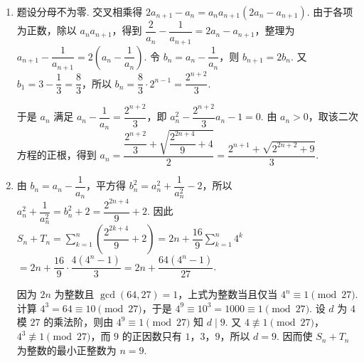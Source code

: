 \begin{solution}
\begin{enumerate}
\item 题设分母不为零. 交叉相乘得
\(2a_{n+1}-a_n=a_na_{n+1}(2a_n-a_{n+1})\).
由于各项为正数，除以 \(a_na_{n+1}\)，得到
\(\dfrac2{a_n}-\dfrac1{a_{n+1}}=2a_n-a_{n+1}\)，整理为
\(a_{n+1}-\dfrac1{a_{n+1}}=2\left(a_n-\dfrac1{a_n}\right)\).
令 \(b_n=a_n-\dfrac1{a_n}\)，则 \(b_{n+1}=2b_n\). 又
\(b_1=3-\dfrac13=\dfrac83\)，所以
\(b_n=\dfrac83\cdot2^{n-1}=\dfrac{2^{n+2}}3\).

于是 \(a_n\) 满足 \(a_n-\dfrac1{a_n}=\dfrac{2^{n+2}}3\)，即
\(a_n^2-\dfrac{2^{n+2}}3a_n-1=0\). 由 \(a_n>0\)，取该二次方程的正根，得到
\(a_n=\dfrac{\dfrac{2^{n+2}}3+\sqrt{\dfrac{2^{2n+4}}9+4}}2
=\dfrac{2^{n+1}+\sqrt{2^{2n+2}+9}}3\).
\item 由 \(b_n=a_n-\dfrac1{a_n}\)，平方得
\(b_n^2=a_n^2+\dfrac1{a_n^2}-2\)，所以
\(a_n^2+\dfrac1{a_n^2}=b_n^2+2=\dfrac{2^{2n+4}}9+2\).
因此
\(S_n+T_n=\sum_{k=1}^n\left(\dfrac{2^{2k+4}}9+2\right)
=2n+\dfrac{16}{9}\sum_{k=1}^n4^k\)
\(=2n+\dfrac{16}{9}\cdot\dfrac{4(4^n-1)}3
=2n+\dfrac{64(4^n-1)}{27}\).

因为 \(2n\) 为整数且 \(\gcd(64,27)=1\)，上式为整数当且仅当
\(4^n\equiv1\pmod{27}\). 计算 \(4^3=64\equiv10\pmod{27}\)，于是
\(4^9\equiv10^3=1000\equiv1\pmod{27}\). 设 \(d\) 为 \(4\) 模 \(27\) 的乘法阶，则由 \(4^9\equiv1\pmod{27}\) 知 \(d\mid9\). 又 \(4\not\equiv1\pmod{27}\)，\(4^3\not\equiv1\pmod{27}\)，而 \(9\) 的正因数只有 \(1\)，\(3\)，\(9\)，所以 \(d=9\). 因而使 \(S_n+T_n\) 为整数的最小正整数为 \(n=9\).
\end{enumerate}
\end{solution}

